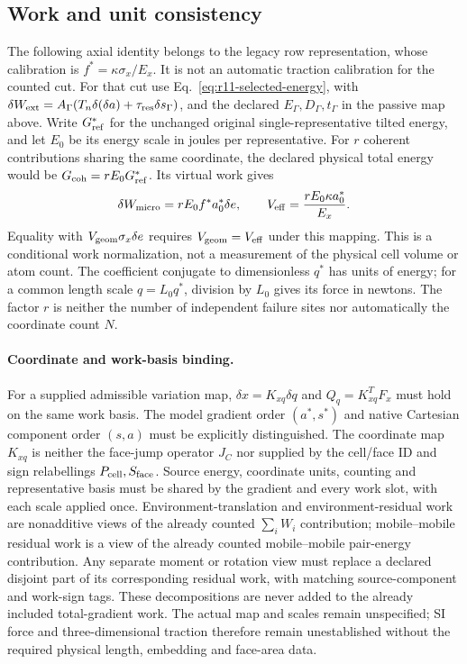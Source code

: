 \documentclass[11pt]{article}
\begin{document}
\subsection{Work and unit consistency}
The following axial identity belongs to the legacy row representation,
whose calibration is $f^*=\kappa\sigma_x/E_x$. It is not an automatic
traction calibration for the counted cut. For that cut use
Eq.~\eqref{eq:r11-selected-energy}, with $\delta W_{\rm ext}=
A_\Gamma(T_n\delta(\delta a)+\tau_{\rm res}\delta s_\Gamma)$,
and the declared $E_\Gamma,D_\Gamma,t_\Gamma$ in the passive map above.
Write $G_{\rm ref}^*$ for the unchanged original single-representative tilted
energy, and let $E_0$ be its energy scale in joules per representative.
For $r$ coherent contributions sharing the same coordinate, the declared
physical total energy would be $G_{\rm coh}=rE_0G_{\rm ref}^*$.
Its virtual work gives
\begin{equation}
 \delta W_{\rm micro}=rE_0f^*a_0^*\delta e,\qquad
 V_{\rm eff}=\frac{rE_0\kappa a_0^*}{E_x}.
\end{equation}
Equality with $V_{\rm geom}\sigma_x\delta e$ requires
$V_{\rm geom}=V_{\rm eff}$ under this mapping. This is a conditional work
normalization, not a measurement of the physical cell volume or atom count.
The coefficient conjugate to dimensionless $q^*$ has units of energy;
for a common length scale $q=L_0q^*$, division by $L_0$ gives its force in newtons.
The factor $r$ is neither the number of independent failure sites nor
automatically the coordinate count $N$.

\paragraph{Coordinate and work-basis binding.}
For a supplied admissible variation map, $\delta x=K_{xq}\delta q$ and
$Q_q=K_{xq}^{T}F_x$ must hold on the same work basis.
The model gradient order $(a^*,s^*)$ and native Cartesian component order
$(s,a)$ must be explicitly distinguished. The coordinate map $K_{xq}$ is
neither the face-jump operator $J_C$ nor supplied by the cell/face ID and
sign relabellings $P_{\rm cell},S_{\rm face}$.
Source energy, coordinate units, counting and representative basis must be
shared by the gradient and every work slot, with each scale applied once.
Environment-translation and environment-residual work are nonadditive views
of the already counted $\sum_i W_i$ contribution; mobile--mobile residual work
is a view of the already counted mobile--mobile pair-energy contribution.
Any separate moment or rotation view must replace a declared disjoint part
of its corresponding residual work, with matching source-component and work-sign tags.
These decompositions are never added to the already included total-gradient work.
The actual map and scales remain unspecified; SI force and three-dimensional
traction therefore remain unestablished without the required physical
length, embedding and face-area data.
\end{document}
